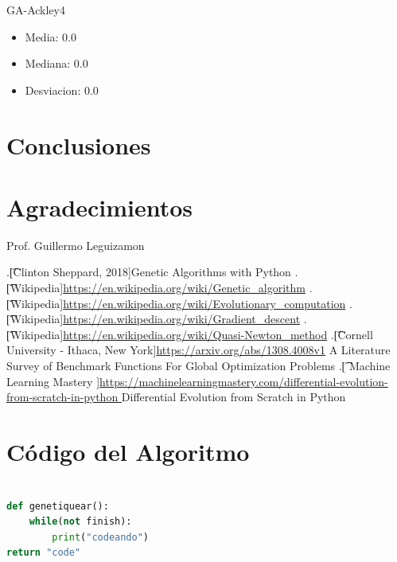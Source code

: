 \documentclass[10pt]{article}
\begin{document}
GA-Ackley4
\begin{itemize}
\item
Media:  0.0 
\item%
Mediana:  0.0 
\item%
Desviacion:  0.0
\end{itemize}






\section{Conclusiones}

\section*{Agradecimientos}
Prof. Guillermo Leguizamon


\begin{thebibliography}{99} %
.\t[Clinton Sheppard, 2018]{}Genetic Algorithms with Python
.\t[Wikipedia]{}\url{https://en.wikipedia.org/wiki/Genetic_algorithm}
.\t[Wikipedia]{}\url{https://en.wikipedia.org/wiki/Evolutionary_computation}
.\t[Wikipedia]{}\url{https://en.wikipedia.org/wiki/Gradient_descent}
.\t[Wikipedia]{}\url{https://en.wikipedia.org/wiki/Quasi-Newton_method}
.\t[Cornell University - Ithaca, New York]{}\url{https://arxiv.org/abs/1308.4008v1} A Literature Survey of Benchmark Functions For Global Optimization Problems
.\t[ Machine Learning Mastery ]{}\url{https://machinelearningmastery.com/differential-evolution-from-scratch-in-python } Differential Evolution from Scratch in Python


\end{thebibliography} 
 
\section{Código del Algoritmo}
\begin{lstlisting}[language=Python]

def genetiquear():
	while(not finish):
		print("codeando")
return "code"

\end{lstlisting}
\newpage
\tableofcontents
\end{document}
